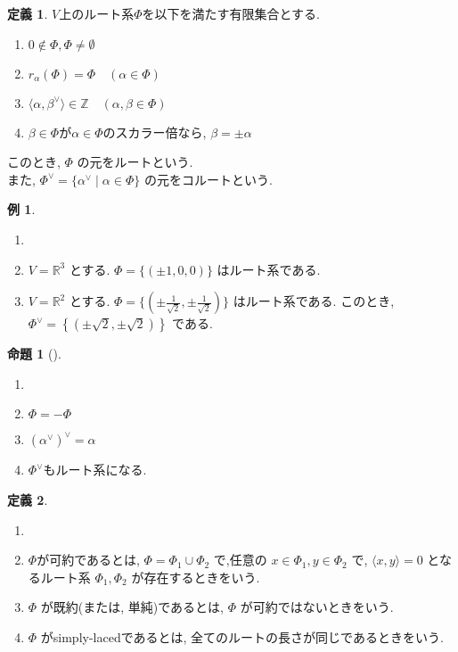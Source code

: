 \documentclass[
  a4paper, 
  12pt,
  ja=standard,
  xelatex,
  left=30truemm,
  right=30truemm,
  titlepage 
]{bxjsarticle}
\theoremstyle{definition}
\newtheorem{df}{定義}
\newtheorem{prop}[thm]{命題}
\newtheorem*{ex}{例}
\begin{document}
\begin{df} 
  $V$上のルート系$\Phi$を以下を満たす有限集合とする.
  \begin{enumerate}
    \item $ 0 \notin \Phi , \Phi \neq \emptyset $
    \item $ r_\alpha (\Phi) = \Phi \quad ( \alpha \in \Phi )$
    \item $ \langle \alpha, \beta^{ \vee } \rangle \in \mathbb{Z} \quad ( \alpha, \beta \in \Phi )$
    \item $ \beta \in \Phi $が$ \alpha \in \Phi $のスカラー倍なら, $ \beta = \pm \alpha $
  \end{enumerate}
  このとき, $ \Phi $ の元をルートという. \\
  また, $ \Phi^{ \vee } = \{ \alpha^{ \vee } \mid \alpha \in \Phi \} $ の元をコルートという.
\end{df}

\begin{ex}
  \begin{enumerate}
    \item[]
    \item $V = \mathbb{R}^3$ とする. $\Phi = \{ (\pm1, 0, 0) \}$ はルート系である.
    \item $V = \mathbb{R}^2$ とする. $\Phi = \{ (\pm \frac{1}{\sqrt{2}}, \pm \frac{1}{\sqrt{2}}) \}$ はルート系である.
    このとき, $ \Phi^{\vee} = \left\{ (\pm \sqrt{2}, \pm \sqrt{2})\right\} $ である.
  \end{enumerate}
\end{ex}

\begin{prop} [{\cite[6章1節命題2]{b3}}] 
  \begin{enumerate}
    \item[]
    \item $\Phi = - \Phi$
    \item $(\alpha^{\vee})^{ \vee} = \alpha$
    \item $\Phi^{\vee}$もルート系になる.
  \end{enumerate}
\end{prop}

\begin{df}  
  \begin{enumerate} 
    \item[]
    \item $ \Phi $が可約であるとは, $ \Phi = \Phi_1 \cup \Phi_2 $ で,任意の $ x \in \Phi_1, y \in \Phi_2 $ で,
    $ \langle x, y \rangle = 0 $ となるルート系 $ \Phi_1, \Phi_2 $ が存在するときをいう.
    \item $ \Phi $ が既約(または, 単純)であるとは, $ \Phi $ が可約ではないときをいう.
    \item $ \Phi $ がsimply-lacedであるとは, 全てのルートの長さが同じであるときをいう.
  \end{enumerate} 
\end{df}
\end{document}
